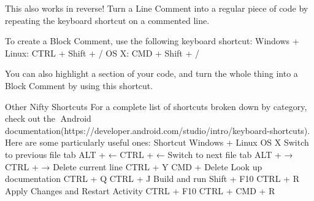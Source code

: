        This also works in reverse! Turn a Line Comment into a regular piece of code by repeating the keyboard shortcut on a commented line.

        To create a Block Comment, use the following keyboard shortcut:
            Windows + Linux: CTRL + Shift + /
            OS X: CMD + Shift + /

        You can also highlight a section of your code, and turn the whole thing into a Block Comment by using this shortcut.

    Other Nifty Shortcuts
        For a complete list of shortcuts broken down by category, check out the 🔗Android documentation(https://developer.android.com/studio/intro/keyboard-shortcuts). Here are some particularly useful ones:
            Shortcut	                        Windows + Linux         OS X
            Switch to previous file tab	        ALT + ←	                CTRL + ←
            Switch to next file tab	            ALT + →	                CTRL + →
            Delete current line	                CTRL + Y	            CMD + Delete
            Look up documentation	            CTRL + Q	            CTRL + J
            Build and run	                    Shift + F10	            CTRL + R
            Apply Changes and Restart Activity	CTRL + F10	            CTRL + CMD + R